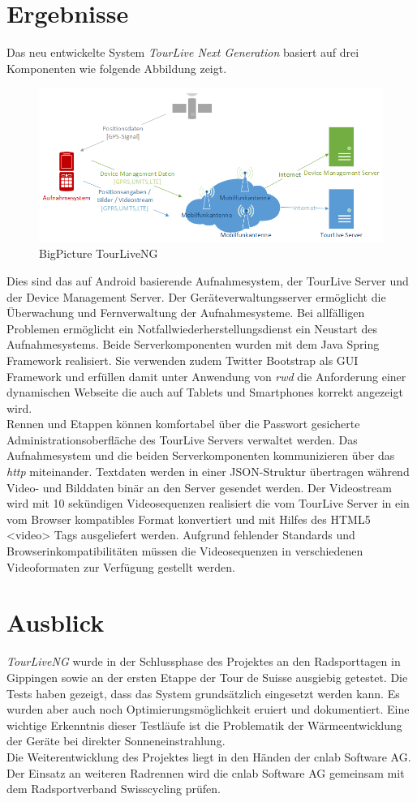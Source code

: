 \section*{Ergebnisse}
Das neu entwickelte System \textit{TourLive Next Generation} basiert auf drei Komponenten wie folgende Abbildung zeigt. 
\begin{figure}[H]
	\centering
	\includegraphics[width=140mm]{images/android/BigPicture_AndroidClient.png} 
	\caption{BigPicture TourLiveNG}
\end{figure}
Dies sind das auf Android basierende Aufnahmesystem, der TourLive Server und der Device Management Server. Der Geräteverwaltungsserver ermöglicht die Überwachung und Fernverwaltung der Aufnahmesysteme. Bei allfälligen Problemen ermöglicht ein Notfallwiederherstellungsdienst ein Neustart des Aufnahmesystems. Beide Serverkomponenten wurden mit dem Java Spring Framework realisiert. Sie verwenden zudem Twitter Bootstrap als GUI Framework und erfüllen damit unter Anwendung von \textit{\gls{rwd}} die Anforderung einer dynamischen Webseite die auch auf Tablets und Smartphones korrekt angezeigt wird. 
\\

Rennen und Etappen können komfortabel über die Passwort gesicherte Administrationsoberfläche des TourLive Servers verwaltet werden. Das Aufnahmesystem und die beiden Serverkomponenten kommunizieren über das \textit{\gls{http}} miteinander. Textdaten werden in einer JSON-Struktur übertragen während Video- und Bilddaten binär an den Server gesendet  werden. Der Videostream wird mit 10 sekündigen Videosequenzen realisiert die vom TourLive Server in ein vom Browser kompatibles Format konvertiert und mit Hilfes des HTML5 <video> Tags ausgeliefert werden. Aufgrund fehlender Standards und Browserinkompatibilitäten müssen die Videosequenzen in verschiedenen Videoformaten zur Verfügung gestellt werden.


\section*{Ausblick}
\textit{TourLiveNG} wurde in der Schlussphase des Projektes an den Radsporttagen in Gippingen sowie an der ersten Etappe der Tour de Suisse ausgiebig getestet. Die Tests haben gezeigt, dass das System grundsätzlich eingesetzt werden kann. Es wurden aber auch noch Optimierungsmöglichkeit eruiert und dokumentiert. Eine wichtige Erkenntnis dieser Testläufe ist die Problematik der Wärmeentwicklung der Geräte bei direkter Sonneneinstrahlung.
\\

Die Weiterentwicklung des Projektes liegt in den Händen der cnlab Software AG. Der Einsatz an weiteren Radrennen wird die cnlab Software AG gemeinsam mit dem Radsportverband Swisscycling prüfen.

